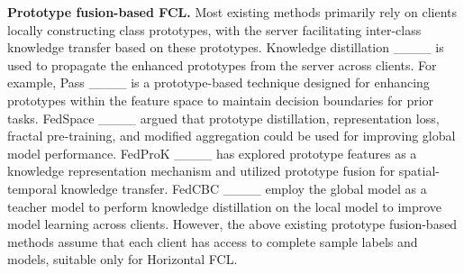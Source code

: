 \noindent\textbf{Prototype fusion-based FCL.}
Most existing methods primarily rely on clients locally constructing class prototypes, with the server facilitating inter-class knowledge transfer based on these prototypes. 
Knowledge distillation ____ is used to propagate the enhanced prototypes from the server across clients.
For example, Pass ____ is a prototype-based technique designed for enhancing prototypes within the feature space to maintain decision boundaries for prior tasks. 
FedSpace ____ argued that prototype distillation, representation loss, fractal pre-training, and modified aggregation could be used for improving global model performance. 
FedProK ____ has explored prototype features as a knowledge representation mechanism and utilized prototype fusion for spatial-temporal knowledge transfer.
FedCBC ____ employ the global model as a teacher model to perform knowledge distillation on the local model to improve model learning across clients.
However, the above existing prototype fusion-based methods assume that each client has access to complete sample labels and models, suitable only for Horizontal FCL.




